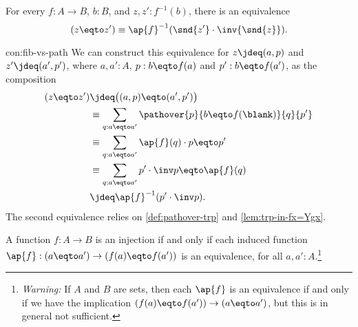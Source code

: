 \begin{construction}\label{con:fib-vs-path}
  For every $f:A\to B$, $b:B$, and $z,z' : f^{-1}(b)$,
  there is an equivalence 
  \begin{equation}\label{eq:fib_vs-path}
    (z \eqto z') \equiv \ap{f}^{-1}(\snd{z'} \cdot \inv{\snd{z}}).
  \end{equation}
\end{construction}

\begin{implementation}{con:fib-vs-path}
  We can construct this equivalence for $z\jdeq(a,p)$ and $z'\jdeq(a',p')$,
  where $a,a':A$, $p:b \eqto f(a)$ and $p':b \eqto f(a')$,
  as the composition
  \begin{align*}
    (z \eqto z')
    &\jdeq \bigl( (a,p) \eqto (a',p') \bigr) \\
    &\equiv \sum_{q : a \eqto a'} \pathover{p}{b \eqto f(\blank)}{q}{p'} \\
    &\equiv \sum_{q : a \eqto a'} \ap{f}(q) \cdot p \eqto p' \\
    &\equiv \sum_{q : a \eqto a'} p' \cdot \inv p \eqto \ap{f}(q) \\
    &\jdeq \ap{f}^{-1}(p' \cdot \inv p).
  \end{align*}
  The second equivalence relies on \cref{def:pathover-trp}
  and \cref{lem:trp-in-fx=Ygx}.
\end{implementation}

\begin{lemma}\label{lem:inj-ap}
  A function $f:A\to B$ is an injection if and only if
  each induced function
  $\ap{f}: (a \eqto a') \to (f(a) \eqto f(a'))$ is an equivalence,
  for all $a,a':A$.\footnote{%
    \emph{Warning:}
    If $A$ and $B$ are sets, then each $\ap{f}$ is an equivalence
    if and only if we have the implication $(f(a) \eqto f(a')) \to (a \eqto a')$,
    but this is in general not sufficient.}
\end{lemma}

